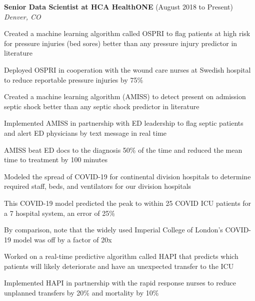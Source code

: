 \begin{resume}
    {\bf Senior Data Scientist at HCA HealthONE} (August 2018 to Present)\\\vspace{2mm}%
    \textit{Denver, CO}
    \begin{stuff}
        \vspace*{1mm}
                \item Created a machine learning algorithm called OSPRI to flag patients at high risk for pressure injuries (bed sores) better than any pressure injury predictor in literature 
                \item Deployed OSPRI in cooperation with the wound care nurses at Swedish hospital to reduce reportable pressure injuries by 75\%
                \item Created a machine learning algorithm (AMISS) to detect present on admission septic shock better than any septic shock predictor in literature
                \item Implemented AMISS in partnership with ED leadership to flag septic patients and alert ED physicians by text message in real time
                \item AMISS beat ED docs to the diagnosis 50\% of the time and reduced the mean time to treatment by 100 minutes
                \item Modeled the spread of COVID-19 for continental division hospitals to determine required staff, beds, and ventilators for our division hospitals 
                \item This COVID-19 model predicted the peak to within 25 COVID ICU patients for a 7 hospital system, an error of 25\%
                \item By comparison, note that the widely used Imperial College of London's COVID-19 model was off by a factor of 20x
                \item Worked on a real-time predictive algorithm called HAPI that predicts which patients will likely deteriorate and have an unexpected transfer to the ICU
                \item Implemented HAPI in partnership with the rapid response nurses to reduce unplanned transfers by 20\% and mortality by 10\% 

\end{stuff}
\end{resume}

